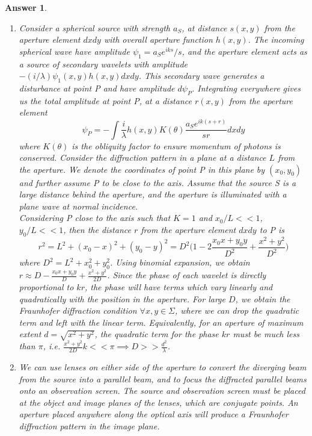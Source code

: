 \documentclass[a4paper]{article}
\newtheorem{ans}{Answer}[subsection]
\theoremstyle{new}
\begin{document}
\begin{ans}\leavevmode
\begin{enumerate}[label=(\roman*)]
\item Consider a spherical source with strength $a_S$, at distance $s(x,y)$ from the aperture element $dxdy$ with overall aperture function $h(x,y)$. The incoming spherical wave have amplitude $\psi_1=a_Se^{iks}/s$, and the aperture element acts as a source of secondary wavelets with amplitude $-(i/\lambda)\psi_1(x,y)h(x,y)dxdy$. This secondary wave generates a disturbance at point P and have amplitude $d\psi_P$. Integrating everywhere gives us the total amplitude at point P, at a distance $r(x,y)$ from the aperture element
$$\psi_P=-\int\frac{i}{\lambda}h(x,y)K(\theta)\frac{a_Se^{ik(s+r)}}{sr}dxdy$$
where $K(\theta)$ is the obliquity factor to ensure momentum of photons is conserved. Consider the diffraction pattern in a plane at a distance $L$ from the aperture. We denote the coordinates of point P in this plane by $(x_0,y_0)$ and further assume P to be close to the axis. Assume that the source S is a large distance behind the aperture, and the aperture is illuminated with a plane wave at normal incidence.\\[5pt]
Considering P close to the axis such that $K=1$ and $x_0/L<<1$, $y_0/L<<1$, then the distance $r$ from the aperture element $dxdy$ to P is
$$r^2=L^2+(x_0-x)^2+(y_0-y)^2=D^2\bigg(1-2\frac{x_0x+y_0y}{D^2}+\frac{x^2+y^2}{D^2}\bigg)$$
where $D^2=L^2+x_0^2+y_0^2$. Using binomial expansion, we obtain $r\approx D-\frac{x_0x+y_0y}{D}+\frac{x^2+y^2}{2D}$. Since the phase of each wavelet is directly proportional to $kr$, the phase will have terms which vary linearly and quadratically with the position in the aperture. For large $D$, we obtain the Fraunhofer diffraction condition $\forall x,y\in\Sigma$, where we can drop the quadratic term and left with the linear term. Equivalently, for an aperture of maximum extent $d=\sqrt{x^2+y^2}$, the quadratic term for the phase $kr$ must be much less than $\pi$, i.e. $\frac{x^2+y^2}{2D}k<<\pi\implies D>>\frac{d^2}{\lambda}$. \item We can use lenses on either side of the aperture to convert the diverging beam from the source into a parallel beam, and to focus the diffracted parallel beams onto an observation screen. The source and observation screen must be placed at the object and image planes of the lenses, which are conjugate points. An aperture placed anywhere along the optical axis will produce a Fraunhofer diffraction pattern in the image plane.
\begin{figure}[H]

\end{figure}
\end{enumerate}
\end{ans}
\end{document}
